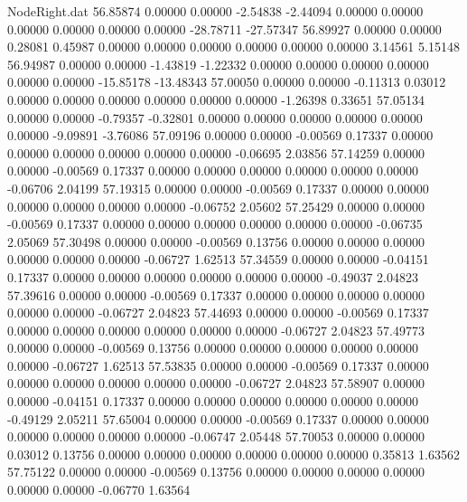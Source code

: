 \begin{filecontents}{NodeRight.dat}
  56.85874    0.00000    0.00000    -2.54838   -2.44094    0.00000    0.00000    0.00000    0.00000    0.00000    0.00000  -28.78711  -27.57347
  56.89927    0.00000    0.00000     0.28081    0.45987    0.00000    0.00000    0.00000    0.00000    0.00000    0.00000    3.14561    5.15148
  56.94987    0.00000    0.00000    -1.43819   -1.22332    0.00000    0.00000    0.00000    0.00000    0.00000    0.00000  -15.85178  -13.48343
  57.00050    0.00000    0.00000    -0.11313    0.03012    0.00000    0.00000    0.00000    0.00000    0.00000    0.00000   -1.26398    0.33651
  57.05134    0.00000    0.00000    -0.79357   -0.32801    0.00000    0.00000    0.00000    0.00000    0.00000    0.00000   -9.09891   -3.76086
  57.09196    0.00000    0.00000    -0.00569    0.17337    0.00000    0.00000    0.00000    0.00000    0.00000    0.00000   -0.06695    2.03856
  57.14259    0.00000    0.00000    -0.00569    0.17337    0.00000    0.00000    0.00000    0.00000    0.00000    0.00000   -0.06706    2.04199
  57.19315    0.00000    0.00000    -0.00569    0.17337    0.00000    0.00000    0.00000    0.00000    0.00000    0.00000   -0.06752    2.05602
  57.25429    0.00000    0.00000    -0.00569    0.17337    0.00000    0.00000    0.00000    0.00000    0.00000    0.00000   -0.06735    2.05069
  57.30498    0.00000    0.00000    -0.00569    0.13756    0.00000    0.00000    0.00000    0.00000    0.00000    0.00000   -0.06727    1.62513
  57.34559    0.00000    0.00000    -0.04151    0.17337    0.00000    0.00000    0.00000    0.00000    0.00000    0.00000   -0.49037    2.04823
  57.39616    0.00000    0.00000    -0.00569    0.17337    0.00000    0.00000    0.00000    0.00000    0.00000    0.00000   -0.06727    2.04823
  57.44693    0.00000    0.00000    -0.00569    0.17337    0.00000    0.00000    0.00000    0.00000    0.00000    0.00000   -0.06727    2.04823
  57.49773    0.00000    0.00000    -0.00569    0.13756    0.00000    0.00000    0.00000    0.00000    0.00000    0.00000   -0.06727    1.62513
  57.53835    0.00000    0.00000    -0.00569    0.17337    0.00000    0.00000    0.00000    0.00000    0.00000    0.00000   -0.06727    2.04823
  57.58907    0.00000    0.00000    -0.04151    0.17337    0.00000    0.00000    0.00000    0.00000    0.00000    0.00000   -0.49129    2.05211
  57.65004    0.00000    0.00000    -0.00569    0.17337    0.00000    0.00000    0.00000    0.00000    0.00000    0.00000   -0.06747    2.05448
  57.70053    0.00000    0.00000     0.03012    0.13756    0.00000    0.00000    0.00000    0.00000    0.00000    0.00000    0.35813    1.63562
  57.75122    0.00000    0.00000    -0.00569    0.13756    0.00000    0.00000    0.00000    0.00000    0.00000    0.00000   -0.06770    1.63564

\end{filecontents}
